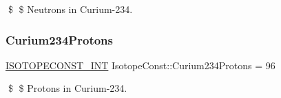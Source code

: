 \$ \$ Neutrons in Curium-\/234. \mbox{\label{group___isotope_const-_curium-_cm234_ga0f4e0783ac84c9803476a5ef3c00f200}} 
\subsubsection{\texorpdfstring{Curium234\+Protons}{Curium234Protons}}
{\footnotesize\ttfamily \mbox{\hyperlink{group___isotope_const-_macros_ga5f18360b3e99483a35c32d789e62621c}{I\+S\+O\+T\+O\+P\+E\+C\+O\+N\+S\+T\+\_\+\+I\+NT}} Isotope\+Const\+::\+Curium234\+Protons = 96}

\$ \$ Protons in Curium-\/234. 